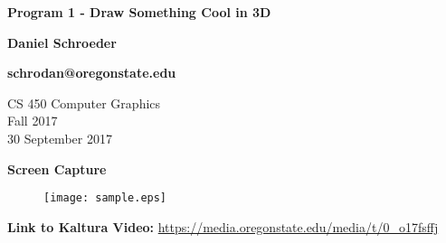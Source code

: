 \documentclass[10pt, draftclsnofoot, onecolumn]{IEEEtran}
\begin{document}
\begin{titlepage}
    \begin{center}
        \vspace*{1.5cm}

        \textbf{Program 1 - Draw Something Cool in 3D}

        \textbf{Daniel Schroeder}
        
        \textbf{schrodan@oregonstate.edu}

        \vspace{1.5cm}

        CS 450 Computer Graphics\\
        Fall 2017\\
        30 September 2017\\

        \vspace{1.5cm}

        \textbf{Screen Capture}
		\begin{figure}[H]
            \centering
            \texttt{[image: sample.eps]}
        \end{figure}

        \vspace{1.5cm}

        \textbf{Link to Kaltura Video:} 
        \url{https://media.oregonstate.edu/media/t/0_o17fsffj}

    \end{center}
\end{titlepage}
\end{document}

